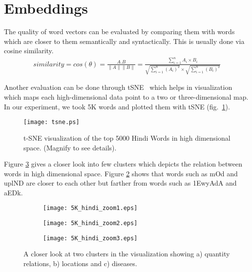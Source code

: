 \section{Embeddings}
The quality of word vectors can be evaluated by comparing them with words which are closer to them semantically and syntactically. This is usually done via cosine similarity.
\begin{align}
similarity=cos(\theta)=\frac{A.B}{\|A\|\|B\|}=\frac{\sum_{i=1}^{n}A_i \times B_i}{\sqrt{\sum_{i=1}^{n}(A_i)^2}\times \sqrt{\sum_{i=1}^{n}(B_i)^2}}
\end{align}

Another evaluation can be done through tSNE~\cite{Maaten:08} which helps in visualization which maps each high-dimensional data point to a two or three-dimensional map. In our experiment, we took 5K words and plotted
them with tSNE (fig.~\ref{fig:5K_hindi}). 

\begin{figure}[H]
\centering
\texttt{[image: tsne.ps]}
\caption{t-SNE visualization of the top 5000 Hindi Words in high dimensional space.  (Magnify to see details). \label{fig:5K_hindi}}
\end{figure}

Figure \ref{fig:5K_hindi_zoom} gives a closer look into few clusters which depicts the relation between words in high dimensional space. Figure \ref{fig:5K_hindi_zoom1} shows that words such as 
{\dn mOd} and {\dn uplND} are closer to each other but farther from words such as {\dn \31EwyAdA} and {\dn aEDk}.

\begin{figure}[H]
    \centering
    \begin{subfigure}{.4\linewidth}
        \texttt{[image: 5K\_hindi\_zoom1.eps]}
        \caption{}
        \label{fig:5K_hindi_zoom1}
    \end{subfigure}
    \newline
    \begin{subfigure}{.4\linewidth}
        \texttt{[image: 5K\_hindi\_zoom2.eps]}
        \caption{}
    \end{subfigure}
    \newline
    \begin{subfigure}{.4\linewidth}
        \texttt{[image: 5K\_hindi\_zoom3.eps]}
        \caption{}
    \end{subfigure}
    \caption{A closer look at two clusters in the visualization showing a) quantity relations, b) locations and c) diseases.}
    \label{fig:5K_hindi_zoom}
\end{figure}


